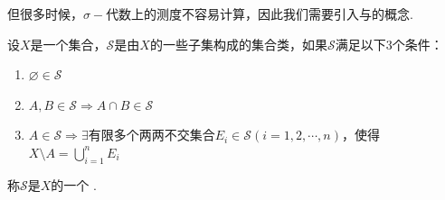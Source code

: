 但很多时候，$\sigma-\!\!$代数上的测度不容易计算，因此我们需要引入与的概念.
\begin{definition}[半代数]\label{def:semi-algebra}
    设$X$是一个集合，$\mathcal{S}$是由$X$的一些子集构成的集合类，如果$\mathcal{S}$满足以下3个条件：
    \begin{enumerate}
        \item $\varnothing\in\mathcal{S}$
        \item $A,B\in\mathcal{S}\Rightarrow A\cap B\in\mathcal{S}$
        \item $A\in\mathcal{S}\Rightarrow \exists\text{有限多个两两不交集合}E_i\in\mathcal{S}(i=1,2,\cdots,n)$，使得$X\setminus A=\bigcup_{i=1}^n{E_i}$
    \end{enumerate}
    称$\mathcal{S}$是$X$的一个 .
\end{definition}


